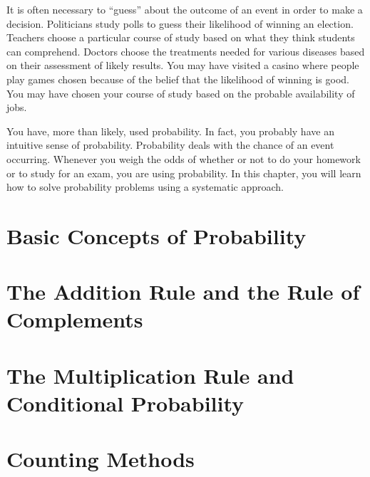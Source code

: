 \documentclass[9pt,letter,twoside,openright]{memoir}
\begin{document}
It is often necessary to ``guess'' about the outcome of an event in order to make a decision. Politicians study polls to guess
their likelihood of winning an election. Teachers choose a particular course of study based on what they think students can
comprehend. Doctors choose the treatments needed for various diseases based on their assessment of likely results. You
may have visited a casino where people play games chosen because of the belief that the likelihood of winning is good. You
may have chosen your course of study based on the probable availability of jobs.

You have, more than likely, used probability. In fact, you probably have an intuitive sense of probability. Probability deals with the chance of an event occurring. Whenever you weigh the odds of whether or not to do your homework or to study for an exam, you are using probability. In this chapter, you will learn how to solve probability problems using a systematic approach.
\vfill
\pagebreak

\section{Basic Concepts of Probability}



\section{The Addition Rule and the Rule of Complements}



\section{The Multiplication Rule and Conditional Probability}



\section{Counting Methods}



\end{document}

